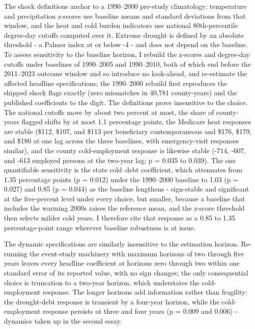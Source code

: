 \documentclass[a4paper,11pt]{report}
\begin{document}
The shock definitions anchor to a 1990--2000 pre-study climatology: temperature and precipitation z-scores use baseline means and standard deviations from that window, and the heat and cold burden indicators use national 80th-percentile degree-day cutoffs computed over it. Extreme drought is defined by an absolute threshold - a Palmer index at or below -4 - and does not depend on the baseline. To assess sensitivity to the baseline horizon, I rebuild the z-scores and degree-day cutoffs under baselines of 1990--2005 and 1990--2010, both of which end before the 2011--2023 outcome window and so introduce no look-ahead, and re-estimate the affected headline specifications; the 1990--2000 rebuild first reproduces the shipped shock flags exactly (zero mismatches in 40,781 county-years) and the published coefficients to the digit. The definitions prove insensitive to the choice. The national cutoffs move by about two percent at most, the share of county-years flagged shifts by at most 1.1 percentage points, the Medicare heat responses are stable (\$112, \$107, and \$113 per beneficiary contemporaneous and \$176, \$179, and \$180 at one lag across the three baselines, with emergency-visit responses similar), and the county cold-employment response is likewise stable (-714, -607, and -613 employed persons at the two-year lag; p = 0.035 to 0.039). The one quantifiable sensitivity is the state cold--debt coefficient, which attenuates from 1.35 percentage points (p = 0.012) under the 1990--2000 baseline to 1.03 (p = 0.027) and 0.85 (p = 0.044) as the baseline lengthens - sign-stable and significant at the five-percent level under every choice, but smaller, because a baseline that includes the warming 2000s raises the reference mean, and the z-score threshold then selects milder cold years. I therefore cite that response as a 0.85 to 1.35 percentage-point range wherever baseline robustness is at issue.

The dynamic specifications are similarly insensitive to the estimation horizon. Re-running the event-study machinery with maximum horizons of two through five years leaves every headline coefficient at horizons zero through two within one standard error of its reported value, with no sign changes; the only consequential choice is truncation to a two-year horizon, which understates the cold-employment response. The longer horizons add information rather than fragility: the drought-debt response is transient by a four-year horizon, while the cold-employment response persists at three and four years (p = 0.009 and 0.006) - dynamics taken up in the second essay.
\end{document}
